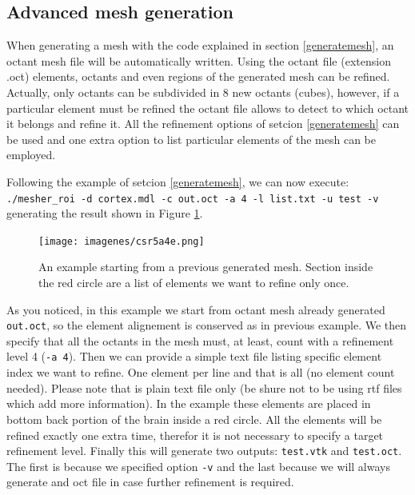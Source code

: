 \documentclass[10pt]{article}
\begin{document}
\subsection{Advanced mesh generation}
\label{regeneratemesh}

When generating a mesh with the code explained in section \ref{generatemesh}, an octant mesh file will be automatically written. Using the octant file (extension .oct) elements, octants and even regions of the generated mesh can be refined. Actually, only octants can be subdivided in 8 new octants (cubes), however, if a particular element must be refined the octant file allows to detect to which octant it belongs and refine it. All the refinement options of setcion \ref{generatemesh} can be used and one extra option to list particular elements of the mesh can be employed.

Following the example of setcion \ref{generatemesh}, we can now execute: \texttt{./mesher\_roi -d cortex.mdl -c out.oct -a 4 -l list.txt -u test -v} generating the result shown in Figure \ref{f:mesheroi2}.

 \begin{figure}[htb]
 \centering
  \texttt{[image: imagenes/csr5a4e.png]}
\caption{An example starting from a previous generated mesh. Section inside the red circle are a list of elements we want to refine only once.}
\label{f:mesheroi2}
\end{figure}

As you noticed, in this example we start from octant mesh already generated \texttt{out.oct}, so the element alignement is conserved as in previous example. We then specify that all the octants in the mesh must, at least, count with a refinement level 4 (\texttt{-a 4}). Then we can provide a simple text file listing specific element index we want to refine. One element per line and that is all (no element count needed). Please note that is plain text file only (be shure not to be using rtf files which add more information). In the example these elements are placed in bottom back portion of the brain inside a red circle. All the elements will be refined exactly one extra time, therefor it is not necessary to specify a target refinement level. Finally this will generate two outputs: \texttt{test.vtk} and \texttt{test.oct}. The first is because we specified option \texttt{-v} and the last because we will always generate and oct file in case further refinement is required. 
\end{document}

